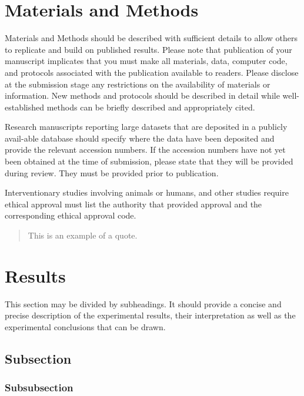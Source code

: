 \documentclass[journal,article,submit,moreauthors,pdftex]{Definitions/mdpi}
\begin{document}
\begin{paracol}{2} %
    \switchcolumn %
    \section{Materials and Methods}
    
    Materials and Methods should be described with sufficient details to allow others to replicate and build on published results. Please note that publication of your manuscript implicates that you must make all materials, data, computer code, and protocols associated with the publication available to readers. Please disclose at the submission stage any restrictions on the availability of materials or information. New methods and protocols should be described in detail while well-established methods can be briefly described and appropriately cited.
    
    Research manuscripts reporting large datasets that are deposited in a publicly avail-able database should specify where the data have been deposited and provide the relevant accession numbers. If the accession numbers have not yet been obtained at the time of submission, please state that they will be provided during review. They must be provided prior to publication.
    
    Interventionary studies involving animals or humans, and other studies require ethical approval must list the authority that provided approval and the corresponding ethical approval code.
    \begin{quote}
        This is an example of a quote.
    \end{quote}
    
    \section{Results}
    
    This section may be divided by subheadings. It should provide a concise and precise description of the experimental results, their interpretation as well as the experimental conclusions that can be drawn.
    \subsection{Subsection}
    \subsubsection{Subsubsection}
    

\end{paracol}
\end{document}

